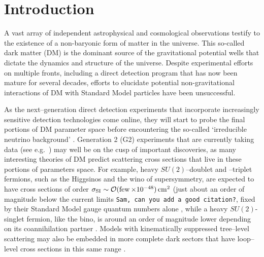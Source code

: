 \documentclass[11pt]{article}
\newcommand{\tenx}[1]{\times 10^{#1}}
\newcommand{\sjwColor}{red}
\newcommand{\sjwtt}[1]{{\color{\sjwColor}\tt #1}}
\begin{document}
\section{Introduction} \setcounter{page}{2}

A vast array of independent astrophysical and cosmological observations testify to the existence of a non-baryonic form of matter in the universe. This so-called dark matter (DM) is the dominant source of the gravitational potential wells that dictate the dynamics and structure of the universe. Despite experimental efforts on multiple fronts, including a direct detection program that has now been mature for several decades, efforts to elucidate potential non-gravitational interactions of DM with Standard Model particles have been unsuccessful. 

As the next--generation direct detection experiments that incorporate increasingly sensitive detection technologies come online, they will start to probe the final portions of DM parameter space before encountering the so-called `irreducible neutrino background' \cite{Bauer:2013ihz,Aprile:2015uzo,Agnese:2016cpb,Malling:2011va,Newstead:2013pea,Cushman:2013zza,Billard:2013qya,Ruppin:2014bra,Davis:2014ama,Dent:2016iht}. Generation 2 (G2) experiments that are currently taking data (see e.g.~\cite{Aprile:2015uzo}) may well be on the cusp of important discoveries, as many interesting theories of DM predict scattering cross sections that live in these portions of parameters space. For example, heavy $SU(2)$--doublet and --triplet fermions, such as the Higgsinos and the wino of supersymmetry, are expected to have cross sections of order $\sigma_{\rm SI} \sim \cO(\few\tenx{-48})\cm^2$ (just about an order of magnitude below the current limits \cite{}\sjwtt{Sam, can you add a good citation?}, fixed by their Standard Model gauge quantum numbers alone \cite{Hill:2011be,Hill:2013hoa,Hill:2014yxa}, while a heavy $SU(2)$-singlet fermion, like the bino, is around an order of magnitude lower depending on its coannihilation partner \cite{Berlin:2015njh}. Models with kinematically suppressed tree--level scattering may also be embedded in more complete dark sectors that have loop--level cross sections in this same range \cite{Ipek:2014gua,McDermott:2014rqa,Appelquist:2015yfa,Appelquist:2015zfa}.
\end{document}
